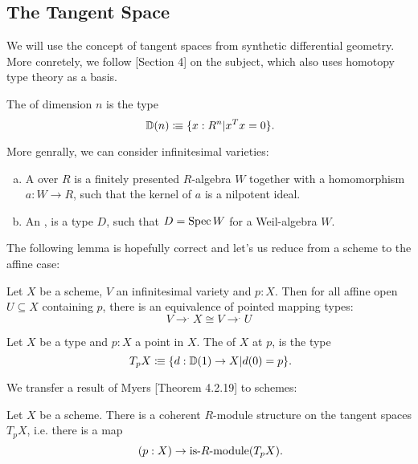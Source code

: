 \subsection{The Tangent Space}

We will use the concept of tangent spaces from synthetic differential geometry.
More conretely, we follow \cite{david-orbifolds}[Section 4]
on the subject, which also uses homotopy type theory as a basis.

\begin{definition}
  The  of dimension $n$ is the type
  \[ \D(n)\colonequiv \{x:R^n\vert x^Tx=0\}\rlap{.}\]
\end{definition}

More genrally, we can consider infinitesimal varieties:

\begin{definition}
  \begin{enumerate}[(a)]
  \item A  over $R$ is a finitely presented $R$-algebra
    $W$ together with a homomorphism $a:W\to R$, such that the kernel of $a$ is a nilpotent ideal.
  \item An , is a type $D$, such that $D=\operatorname{Spec} W$ for a Weil-algebra $W$.
  \end{enumerate}
\end{definition}

The following lemma is hopefully correct and let's us reduce
from a scheme
to the affine case:

\begin{lemma}
  \label{affine-opens-infinitesimal-closed}
  Let $X$ be a scheme, $V$ an infinitesimal variety and $p:X$.
  Then for all affine open $U\subseteq X$
  containing $p$, there is an equivalence
  of pointed mapping types:
  \[ V\to^. X \cong V\to^. U\]
\end{lemma}

\begin{definition}
  Let $X$ be a type and $p:X$ a point in $X$.
  The  of $X$ at $p$, is the type
  \[ T_pX\colonequiv \{d:\D(1)\to X\vert d(0)=p \}\rlap{.}\]
\end{definition}

We transfer a result of Myers \cite{david-orbifolds}[Theorem 4.2.19] to schemes:

\begin{theorem}%
  Let $X$ be a scheme.
  There is a coherent $R$-module structure on the tangent spaces $T_pX$,
  i.e. there is a map
  \[ (p:X)\to \text{is-$R$-module}(T_pX)\rlap{.}\]
\end{theorem}

